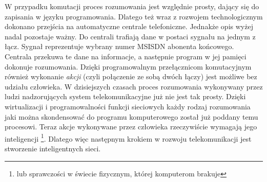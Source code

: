 W przypadku komutacji proces rozumowania jest względnie prosty, dający się do zapisania w języku programowania. Dlatego też wraz z rozwojem technologicznym dokonano przejścia na automatyczne centrale telefoniczne. Jednakże opis wyżej nadal pozostaje ważny. Do centrali trafiają dane w postaci sygnału na jednym z łącz. Sygnał reprezentuje wybrany numer MSISDN abonenta końcowego. Centrala przekuwa te dane na informacje, a następnie program w jej pamięci dokonuje rozumowania. Dzięki programowalnym przełącznicom komutacyjnym również wykonanie \textit{akcji} (czyli połączenie ze sobą dwóch łączy) jest możliwe bez udziału człowieka. W dzisiejszych czasach proces rozumowania wykonywany przez ludzi nadzorujących system telekomunikacyjne już nie jest tak prosty. Dzięki wirtualizacji i programowalności funkcji sieciowych każdy rodzaj rozumowania jaki można skondensować do programu komputerowego został już poddany temu procesowi. Teraz akcje wykonywane przez człowieka rzeczywiście wymagają jego inteligencji \footnote{lub sprawczości w świecie fizycznym, której komputerom brakuje}. Dlatego więc następnym krokiem w rozwoju telekomunikacji jest stworzenie inteligentnych sieci. 



